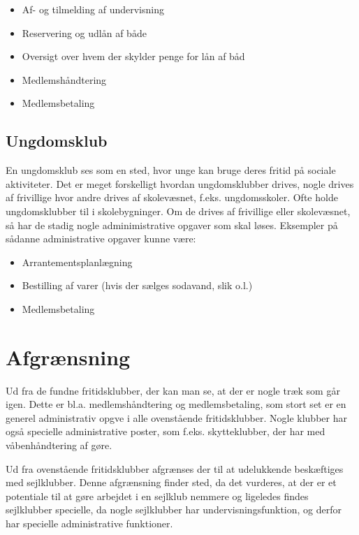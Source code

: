 \begin{itemize}
\item Af- og tilmelding af undervisning
\item Reservering og udlån af både
\item Oversigt over hvem der skylder penge for lån af båd
\item Medlemshåndtering
\item Medlemsbetaling
\end{itemize}

\subsection{Ungdomsklub}

En ungdomsklub ses som en sted, hvor unge kan bruge deres fritid på sociale aktiviteter. Det er meget forskelligt hvordan ungdomsklubber drives, nogle drives af frivillige hvor andre drives af skolevæsnet, f.eks. ungdomsskoler. Ofte holde ungdomsklubber til i skolebygninger. Om de drives af frivillige eller skolevæsnet, så har de stadig nogle adminimistrative opgaver som skal løses. Eksempler på sådanne administrative opgaver kunne være:

\begin{itemize}
\item Arrantementsplanlægning
\item Bestilling af varer (hvis der sælges sodavand, slik o.l.)
\item Medlemsbetaling
\end{itemize}

\section{Afgrænsning}

Ud fra de fundne fritidsklubber, der kan man se, at der er nogle træk som går igen. Dette er bl.a. medlemshåndtering og medlemsbetaling, som stort set er en generel administrativ opgve i alle ovenstående fritidsklubber. Nogle klubber har også specielle administrative poster, som f.eks. skytteklubber, der har med våbenhåndtering af gøre.

Ud fra ovenstående fritidsklubber afgrænses der til at udelukkende beskæftiges med sejlklubber. Denne afgrænsning finder sted, da det vurderes, at der er et potentiale til at gøre arbejdet i en sejlklub nemmere og ligeledes findes sejlklubber specielle, da nogle sejlklubber har undervisningsfunktion, og derfor har specielle administrative funktioner. 

